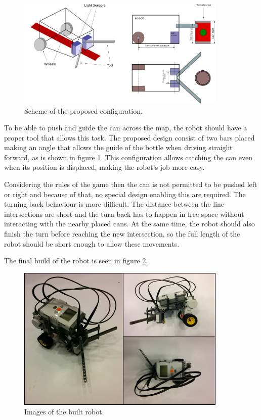 \documentclass[12pt,a4paper]{article}
\begin{document}
\begin{figure}[H]
\includegraphics[width=10cm]{Fig2.png}
\centering
\caption{Scheme of the proposed configuration.}
\label{fig:robotscheme}
\end{figure}


To be able to push and guide the can across the map, the robot should have a proper tool that allows this task. 
The proposed design consist of two bars placed making an angle that allows the guide of the bottle when driving straight forward, as is shown in figure \ref{fig:robotscheme}.
This configuration allows catching the can even when its position is displaced, making the robot's job more easy.

Considering the rules of the game then the can is not permitted to be pushed left or right and because of that, no special design enabling this are required. 
The turning back behaviour is more difficult. 
The distance between the line intersections are short and the turn back has to happen in free space without interacting with the nearby placed cans.
At the same time, the robot should also finish the turn before reaching the new intersection, so the full length of the robot should be short enough to allow these movements.


The final build of the robot is seen in figure \ref{fig:robotImage}.

\begin{figure}[H]
\includegraphics[width=10cm]{Fig1.png}
\centering
\caption{Images of the built robot.}
\label{fig:robotImage}
\end{figure}



\end{document}
